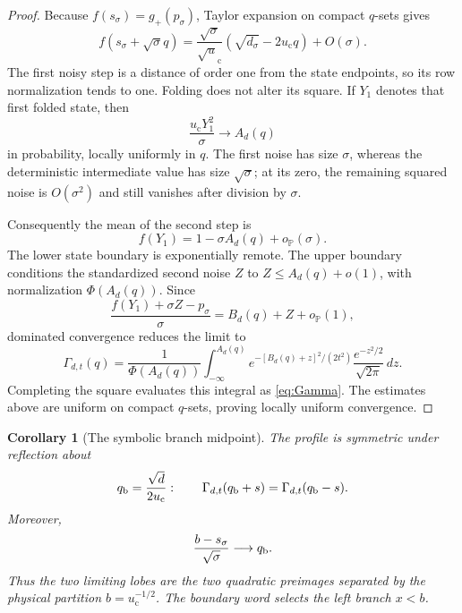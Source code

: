 \documentclass[11pt]{article}
\newtheorem{corollary}[theorem]{Corollary}
\theoremstyle{definition}
\theoremstyle{remark}
\newcommand{\uc}{u_{\mathrm c}}
\begin{document}
\begin{proof}
Because $f(s_\sigma)=g_+(p_\sigma)$, Taylor expansion on compact
$q$-sets gives
\begin{equation}\label{eq:first-critical-expansion}
 f(s_\sigma+\sqrt\sigma q)
 =\frac{\sqrt\sigma}{\sqrt\uc}
 (\sqrt{d_\sigma}-2\uc q)+O(\sigma).
\end{equation}
The first noisy step is a distance of order one from the state endpoints,
so its row normalization tends to one.  Folding does not alter its square.
If $Y_1$ denotes that first folded state, then
\begin{equation}\label{eq:first-square-limit}
 \frac{\uc Y_1^2}{\sigma}
 \longrightarrow A_d(q)
\end{equation}
in probability, locally uniformly in $q$.  The first noise has size
$\sigma$, whereas the deterministic intermediate value has size
$\sqrt\sigma$; at its zero, the remaining squared noise is $O(\sigma^2)$
and still vanishes after division by $\sigma$.

Consequently the mean of the second step is
\begin{equation}\label{eq:second-mean}
 f(Y_1)=1-\sigma A_d(q)+o_{\mathbb P}(\sigma).
\end{equation}
The lower state boundary is exponentially remote.  The upper boundary
conditions the standardized second noise $Z$ to $Z\le A_d(q)+o(1)$, with
normalization $\Phi(A_d(q))$.  Since
\[
 \frac{f(Y_1)+\sigma Z-p_\sigma}{\sigma}
 =B_d(q)+Z+o_{\mathbb P}(1),
\]
dominated convergence reduces the limit to
\begin{equation}\label{eq:profile-integral}
 \Gamma_{d,t}(q)
 =\frac1{\Phi(A_d(q))}
 \int_{-\infty}^{A_d(q)}
 e^{-[B_d(q)+z]^2/(2t^2)}
 \frac{e^{-z^2/2}}{\sqrt{2\pi}}\,dz.
\end{equation}
Completing the square evaluates this integral as \eqref{eq:Gamma}.
The estimates above are uniform on compact $q$-sets, proving locally uniform
convergence.
\end{proof}

\begin{corollary}[The symbolic branch midpoint]
\label{cor:critical-midpoint}
The profile is symmetric under reflection about
\begin{equation}\label{eq:q-midpoint}
 q_{\rm b}=\frac{\sqrt d}{2\uc}:
 \qquad
 \Gamma_{d,t}(q_{\rm b}+s)
 =\Gamma_{d,t}(q_{\rm b}-s).
\end{equation}
Moreover,
\begin{equation}\label{eq:partition-coordinate}
 \frac{b-s_\sigma}{\sqrt\sigma}
 \longrightarrow q_{\rm b}.
\end{equation}
Thus the two limiting lobes are the two quadratic preimages separated by the
physical partition $b=\uc^{-1/2}$.  The boundary word selects the left branch
$x<b$.
\end{corollary}
\end{document}
